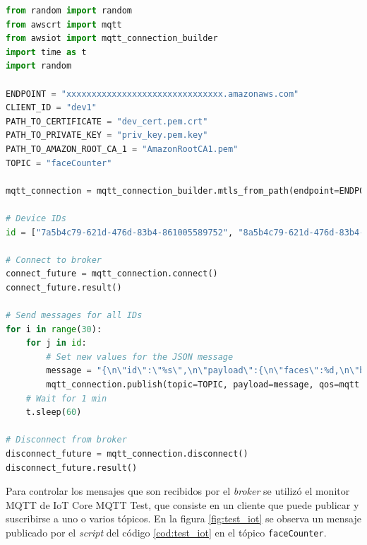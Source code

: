 \begin{lstlisting}[language=Python, label=cod:test_iot, caption=Código del \textit{script} para probar IoT Core.]
from random import random
from awscrt import mqtt
from awsiot import mqtt_connection_builder
import time as t
import random

ENDPOINT = "xxxxxxxxxxxxxxxxxxxxxxxxxxxxxxx.amazonaws.com"
CLIENT_ID = "dev1"
PATH_TO_CERTIFICATE = "dev_cert.pem.crt"
PATH_TO_PRIVATE_KEY = "priv_key.pem.key"
PATH_TO_AMAZON_ROOT_CA_1 = "AmazonRootCA1.pem"
TOPIC = "faceCounter"

mqtt_connection = mqtt_connection_builder.mtls_from_path(endpoint=ENDPOINT, cert_filepath=PATH_TO_CERTIFICATE, pri_key_filepath=PATH_TO_PRIVATE_KEY, ca_filepath=PATH_TO_AMAZON_ROOT_CA_1, client_id=CLIENT_ID, clean_session=False, keep_alive_secs=6)

# Device IDs
id = ["7a5b4c79-621d-476d-83b4-861005589752", "8a5b4c79-621d-476d-83b4-861005589752", "9a5b4c79-621d-476d-83b4-861005589752"]

# Connect to broker
connect_future = mqtt_connection.connect()
connect_future.result()

# Send messages for all IDs
for i in range(30):
    for j in id:
        # Set new values for the JSON message
        message = "{\n\"id\":\"%s\",\n\"payload\":{\n\"faces\":%d,\n\"battery\":%d,\n\"temperature\":%d\n}\n}" % (j, random.randint(0, 5), random.randint(50, 90), random.randint(19, 27))
        mqtt_connection.publish(topic=TOPIC, payload=message, qos=mqtt.QoS.AT_LEAST_ONCE)
    # Wait for 1 min
    t.sleep(60)

# Disconnect from broker
disconnect_future = mqtt_connection.disconnect()
disconnect_future.result()
\end{lstlisting}

Para controlar los mensajes que son recibidos por el \textit{broker} se utilizó el monitor MQTT de IoT Core MQTT Test, que consiste en un cliente que puede publicar y suscribirse a uno o varios tópicos. En la figura \ref{fig:test_iot} se observa un mensaje publicado por el \textit{script} del código \ref{cod:test_iot} en el tópico \texttt{faceCounter}.


